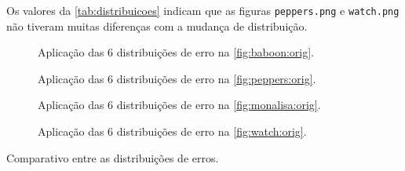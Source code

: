 Os valores da \cref{tab:distribuicoes} indicam que as figuras \texttt{peppers.png} e \texttt{watch.png} não tiveram muitas diferenças com a mudança de distribuição.

\begin{figure}[H]
    \centering
    
    \caption{Aplicação das 6 distribuições de erro na \cref{fig:baboon:orig}.}
\end{figure}

\begin{figure}[H]
    \centering
    
    \caption{Aplicação das 6 distribuições de erro na \cref{fig:peppers:orig}.}
\end{figure}

\begin{figure}[H]
    \centering
    
    \caption{Aplicação das 6 distribuições de erro na \cref{fig:monalisa:orig}.}
\end{figure}

\begin{figure}[H]
    \centering
    
    \caption{Aplicação das 6 distribuições de erro na \cref{fig:watch:orig}.}
\end{figure}

\begin{table}[H]
    \centering
    \caption{Comparativo entre as distribuições de erros.}
    \label{tab:distribuicoes}
    
\end{table}
